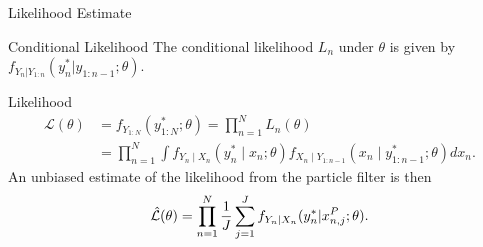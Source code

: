 \documentclass{beamer}
\begin{document}
\begin{frame}{Likelihood Estimate}
    \begin{block}{Conditional Likelihood}
        The conditional likelihood $L_n$ under $\theta$ is given by $f_{Y_n|Y_{1:n}}(y_{n}^*|y_{1:n-1};\theta)$.
    \end{block}
    \pause
    \begin{block}{Likelihood}
        \begin{align*}
            \mathcal{L}(\theta)&=f_{Y_{1: N}}\left(y_{1: N}^* ; \theta\right)
            = \prod_{n=1}^N L_n(\theta)\\
            &=\prod_{n=1}^N \int f_{Y_n \mid X_n}\left(y_n^* \mid x_n ; \theta\right) f_{X_n \mid Y_{1: n-1}}\left(x_n \mid y_{1: n-1}^* ; \theta\right) d x_n.
        \end{align*}
    \pause
    An unbiased estimate of the likelihood from the particle filter is then
        $$\hat{\mathcal{L}}(\theta) = \prod_{n=1}^N \frac{1}{J}\sum_{j=1}^J f_{Y_n|X_n}(y_n^*|x_{n,j}^P;\theta).$$
    \end{block}
\end{frame}
\end{document}
